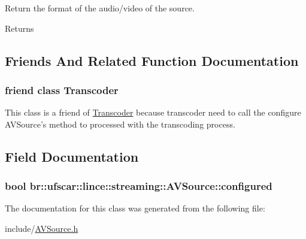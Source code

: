 Return the format of the audio/video of the source. 

\begin{DoxyReturn}{Returns}

\end{DoxyReturn}


\subsection{Friends And Related Function Documentation}
\hypertarget{classbr_1_1ufscar_1_1lince_1_1streaming_1_1AVSource_af9f366fbe5cbc06f38791f120c62c182}{
\subsubsection[{Transcoder}]{\setlength{\rightskip}{0pt plus 5cm}friend class {\bf Transcoder}}}
\label{classbr_1_1ufscar_1_1lince_1_1streaming_1_1AVSource_af9f366fbe5cbc06f38791f120c62c182}


This class is a friend of \hyperlink{classbr_1_1ufscar_1_1lince_1_1streaming_1_1Transcoder}{Transcoder} because transcoder need to call the configure AVSource's method to processed with the transcoding process. 



\subsection{Field Documentation}
\hypertarget{classbr_1_1ufscar_1_1lince_1_1streaming_1_1AVSource_ab4ba884cad02dfb18ef5afac68c1e1cf}{
\subsubsection[{configured}]{\setlength{\rightskip}{0pt plus 5cm}bool {\bf br::ufscar::lince::streaming::AVSource::configured}}}
\label{classbr_1_1ufscar_1_1lince_1_1streaming_1_1AVSource_ab4ba884cad02dfb18ef5afac68c1e1cf}


The documentation for this class was generated from the following file:\begin{DoxyCompactItemize}
\item 
include/\hyperlink{AVSource_8h}{AVSource.h}\end{DoxyCompactItemize}
